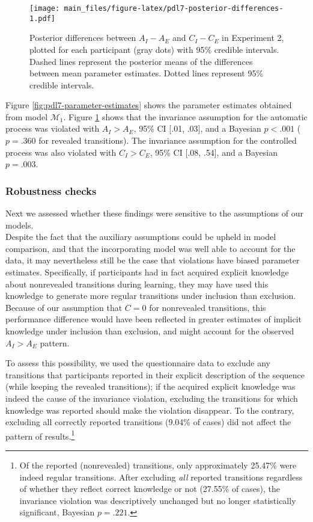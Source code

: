 \documentclass[jou]{apa6}
\theoremstyle{definition}
\theoremstyle{definition}
\theoremstyle{definition}
\theoremstyle{remark}
\begin{document}
\begin{figure}[htbp]
\centering
\texttt{[image: main\_files/figure-latex/pdl7-posterior-differences-1.pdf]}
\caption{\label{fig:pdl7-posterior-differences}Posterior differences between
\(A_I - A_E\) and \(C_I - C_E\) in Experiment 2, plotted for each
participant (gray dots) with 95\% credible intervals. Dashed lines
represent the posterior means of the differences between mean parameter
estimates. Dotted lines represent 95\% credible intervals.}
\end{figure}

Figure \ref{fig:pdl7-parameter-estimates} shows the parameter estimates
obtained from model \(\mathcal{M}_1\). Figure
\ref{fig:pdl7-posterior-differences} shows that the invariance
assumption for the automatic process was violated with \(A_I > A_E\),
95\% CI {[}.01, .03{]}, and a Bayesian \(p < .001\) (\(p = .360\) for
revealed transitions). The invariance assumption for the controlled
process was also violated with \(C_I > C_E\), 95\% CI {[}.08, .54{]},
and a Bayesian \(p = .003\).

\subsubsection{Robustness checks}\label{robustness-checks}

Next we assessed whether these findings were sensitive to the
assumptions of our models.\\
Despite the fact that the auxiliary assumptions could be upheld in model
comparison, and that the incorporating model was well able to account
for the data, it may nevertheless still be the case that violations have
biased parameter estimates. Specifically, if participants had in fact
acquired explicit knowledge about nonrevealed transitions during
learning, they may have used this knowledge to generate more regular
transitions under inclusion than exclusion. Because of our assumption
that \(C = 0\) for nonrevealed transitions, this performance difference
would have been reflected in greater estimates of implicit knowledge
under inclusion than exclusion, and might account for the observed
\(A_{I} > A_{E}\) pattern.

To assess this possibility, we used the questionnaire data to exclude
any transitions that participants reported in their explicit description
of the sequence (while keeping the revealed transitions); if the
acquired explicit knowledge was indeed the cause of the invariance
violation, excluding the transitions for which knowledge was reported
should make the violation disappear. To the contrary, excluding all
correctly reported transitions (9.04\% of cases) did not affect the
pattern of results.\footnote{Of the reported (nonrevealed) transitions,
  only approximately 25.47\% were indeed regular transitions. After
  excluding \emph{all} reported transitions regardless of whether they
  reflect correct knowledge or not (27.55\% of cases), the invariance
  violation was descriptively unchanged but no longer statistically
  significant, Bayesian \(p = .221\).}
\end{document}
